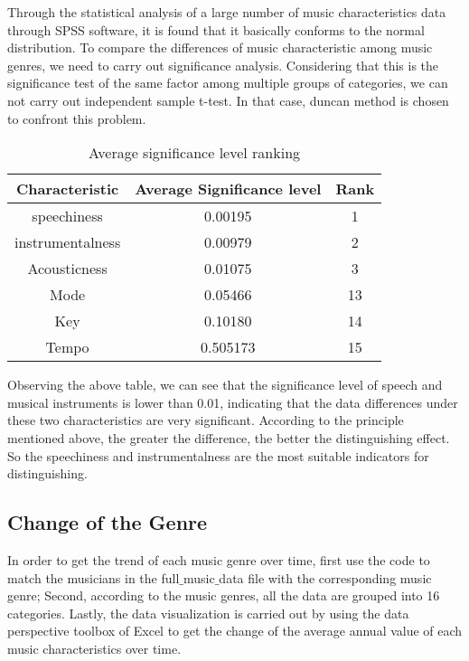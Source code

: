 \documentclass{mcmthesis}
\begin{document}
 Through the statistical analysis of a large number of music characteristics data through SPSS software, it is found that it basically conforms to the normal distribution. To compare the differences of music characteristic among music genres, we need to carry out significance analysis. Considering that this is the significance test of the same factor among multiple groups of categories, we can not carry out independent sample t-test. In that case, duncan method is chosen to confront this problem.
 \begin{table}[H]
 	\centering  
 	\caption{Average significance level ranking}
 	
 	\label{table_time}
 	
 	\begin{tabular}{ccc}  
 		
 		\toprule   
 		
 		Characteristic&Average Significance level &Rank \\ 
 		\midrule    
 		speechiness&0.00195&1
 		\\  
 		instrumentalness & 0.00979&2 
 		\\ 
 		Acousticness & 0.01075&3
 		\\       
 		Mode &0.05466&13
 		\\
 		Key&0.10180&14
 		\\
 		Tempo&0.505173&15
 		\\
 		\bottomrule  
 		
 	\end{tabular}
 \end{table}
 Observing the above table, we can see that the significance level of speech and musical instruments is lower than 0.01, indicating that the data differences under these two characteristics are very significant. According to the principle mentioned above,  the greater the difference, the better the distinguishing effect. So the speechiness
  and instrumentalness are the most suitable indicators for distinguishing.


\subsection{Change of the Genre} 
 
 In order to get the trend of each music genre over time, first use the code to match the musicians in the full$\_$music$\_$data file with the corresponding music genre; Second, according to the music genres, all the data are grouped into 16 categories. Lastly, the data visualization is carried out by using the data perspective toolbox of Excel to get the change of the average annual value of each music characteristics over time. 
 
\end{document}
